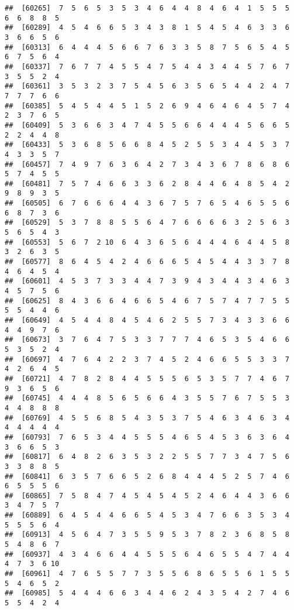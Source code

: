 \documentclass[
]{book}
\begin{document}
\begin{verbatim}
##  [60265]  7  5  6  5  3  5  3  4  6  4  4  8  4  6  4  1  5  5  5  6  6  8  8  5
##  [60289]  4  5  4  6  6  5  3  4  3  8  1  5  4  5  4  6  3  3  6  3  6  6  5  6
##  [60313]  6  4  4  4  5  6  6  7  6  3  3  5  8  7  5  6  5  4  5  6  7  5  6  4
##  [60337]  7  6  7  7  4  5  5  4  7  5  4  4  3  4  4  5  7  6  7  3  5  5  2  4
##  [60361]  3  5  3  2  3  7  5  4  5  6  3  5  6  5  4  4  2  4  7  7  7  7  6  6
##  [60385]  5  4  5  4  4  5  1  5  2  6  9  4  6  4  6  4  5  7  4  2  3  7  6  5
##  [60409]  5  3  6  6  3  4  7  4  5  5  6  6  4  4  4  5  6  6  5  2  2  4  4  8
##  [60433]  5  3  6  8  5  6  6  8  4  5  2  5  5  3  4  4  5  3  7  4  3  3  5  7
##  [60457]  7  4  9  7  6  3  6  4  2  7  3  4  3  6  7  8  6  8  6  5  7  4  5  5
##  [60481]  7  5  7  4  6  6  3  3  6  2  8  4  4  6  4  8  5  4  2  9  8  9  3  5
##  [60505]  6  7  6  6  6  4  4  3  6  7  5  7  6  5  4  6  5  5  6  6  8  7  3  6
##  [60529]  5  3  7  8  8  5  5  6  4  7  6  6  6  6  3  2  5  6  3  5  6  5  4  3
##  [60553]  5  6  7  2 10  6  4  3  6  5  6  4  4  4  6  4  4  5  8  3  2  6  3  5
##  [60577]  8  6  4  5  4  2  4  6  6  6  5  4  5  4  4  3  3  7  8  4  6  4  5  4
##  [60601]  4  5  3  7  3  3  4  4  7  3  9  4  3  4  4  3  4  6  3  4  5  7  5  6
##  [60625]  8  4  3  6  6  4  6  6  5  4  6  7  5  7  4  7  7  5  5  5  5  4  4  6
##  [60649]  4  5  4  4  8  4  5  4  6  2  5  5  7  3  4  3  3  6  6  4  4  9  7  6
##  [60673]  3  7  6  4  7  5  3  3  7  7  7  4  6  5  3  5  4  6  6  5  3  5  2  4
##  [60697]  4  7  6  4  2  2  3  7  4  5  2  4  6  6  5  5  3  3  7  4  2  6  4  5
##  [60721]  4  7  8  2  8  4  4  5  5  5  6  5  3  5  7  7  4  6  7  9  3  6  5  6
##  [60745]  4  4  4  8  5  6  5  6  6  4  3  5  5  7  6  7  5  5  3  4  4  8  8  8
##  [60769]  4  5  5  6  8  5  4  3  5  3  7  5  4  6  3  4  6  3  4  4  4  4  4  4
##  [60793]  7  6  5  3  4  4  5  5  5  4  6  5  4  5  3  6  3  6  4  3  6  6  5  3
##  [60817]  6  4  8  2  6  3  5  3  2  2  5  5  7  7  3  4  7  5  6  3  3  8  8  5
##  [60841]  6  3  5  7  6  6  5  2  6  8  4  4  4  5  2  5  7  4  6  6  5  5  5  6
##  [60865]  7  5  8  4  7  4  5  4  5  4  5  2  4  6  4  4  3  6  6  3  4  7  5  7
##  [60889]  6  4  5  4  4  6  6  5  4  5  3  4  7  6  6  3  5  3  4  5  5  5  6  4
##  [60913]  4  5  6  4  7  3  5  5  9  5  3  7  8  2  3  6  8  5  8  5  4  8  6  7
##  [60937]  4  3  4  6  6  4  4  5  5  5  6  4  6  5  5  4  7  4  4  4  7  3  6 10
##  [60961]  4  7  6  5  5  7  7  3  5  5  6  8  6  5  5  6  1  5  5  5  4  6  5  2
##  [60985]  5  4  4  4  6  6  3  4  4  6  2  4  3  5  4  2  7  4  6  5  5  4  2  4

\end{verbatim}
\end{document}

